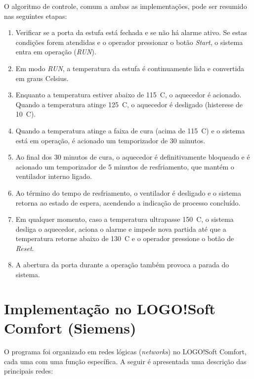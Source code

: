 \documentclass[
  12pt,
  openright,
  oneside,
  a4paper,
  chapter=TITLE,
  section=TITLE,
  brazilian
]{abntex2}
\begin{document}
O algoritmo de controle, comum a ambas as implementa\c{c}\~{o}es, pode ser resumido nas seguintes etapas:

\begin{enumerate}
    \item Verificar se a porta da estufa est\'{a} fechada e se n\~{a}o h\'{a} alarme ativo. Se estas condi\c{c}\~{o}es forem atendidas e o operador pressionar o bot\~{a}o \textit{Start}, o sistema entra em opera\c{c}\~{a}o (\textit{RUN}).
    \item Em modo \textit{RUN}, a temperatura da estufa \'{e} continuamente lida e convertida em graus Celsius.
    \item Enquanto a temperatura estiver abaixo de 115~\textdegree{}C, o aquecedor \'{e} acionado. Quando a temperatura atinge 125~\textdegree{}C, o aquecedor \'{e} desligado (histerese de 10~\textdegree{}C).
    \item Quando a temperatura atinge a faixa de cura (acima de 115~\textdegree{}C) e o sistema est\'{a} em opera\c{c}\~{a}o, \'{e} acionado um temporizador de 30 minutos.
    \item Ao final dos 30 minutos de cura, o aquecedor \'{e} definitivamente bloqueado e \'{e} acionado um temporizador de 5 minutos de resfriamento, que mant\'{e}m o ventilador interno ligado.
    \item Ao t\'{e}rmino do tempo de resfriamento, o ventilador \'{e} desligado e o sistema retorna ao estado de espera, acendendo a indica\c{c}\~{a}o de processo conclu\'{i}do.
    \item Em qualquer momento, caso a temperatura ultrapasse 150~\textdegree{}C, o sistema desliga o aquecedor, aciona o alarme e impede nova partida at\'{e} que a temperatura retorne abaixo de 130~\textdegree{}C e o operador pressione o bot\~{a}o de \textit{Reset}.
    \item A abertura da porta durante a opera\c{c}\~{a}o tamb\'{e}m provoca a parada do sistema.
\end{enumerate}

\section{Implementa\c{c}\~{a}o no LOGO!Soft Comfort (Siemens)}

O programa foi organizado em redes l\'{o}gicas (\textit{networks}) no LOGO!Soft Comfort, cada uma com uma fun\c{c}\~{a}o espec\'{i}fica. A seguir \'{e} apresentada uma descri\c{c}\~{a}o das principais redes:
\end{document}
